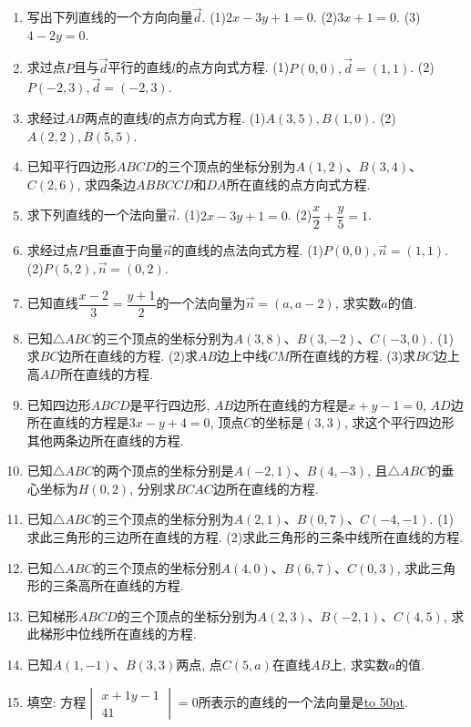 \documentclass[10pt,a4paper]{article}
\newcommand{\blank}[1]{\underline{\hbox to #1pt{}}}
\begin{document}
\begin{enumerate}[1.]



\item 写出下列直线的一个方向向量$\overrightarrow d$.
(1)$2x-3y+1=0$.						(2)$3x+1=0$.
(3)$4-2y=0$.
\item 求过点$P$且与$\overrightarrow d$平行的直线$l$的点方向式方程.
(1)$P(0,0),\overrightarrow d=(1,1)$.					(2)$P(-2,3),\overrightarrow d=(-2,3)$.
\item 求经过$AB$两点的直线$l$的点方向式方程.
(1)$A(3,5),B(1,0)$.						(2)$A(2,2),B(5,5)$.
\item 已知平行四边形$ABCD$的三个顶点的坐标分别为$A(1,2)$、$B(3,4)$、$C(2,6)$, 求四条边$ABBCCD$和$DA$所在直线的点方向式方程.
\item 求下列直线的一个法向量$\overrightarrow n$.
(1)$2x-3y+1=0$.						(2)$\dfrac x2+\dfrac y5=1$.
\item 求经过点$P$且垂直于向量$\overrightarrow n$的直线的点法向式方程.
(1)$P(0,0),\overrightarrow n=(1,1)$.					(2)$P(5,2),\overrightarrow n=(0,2)$.
\item 已知直线$\dfrac{x-2}3=\dfrac{y+1}2$的一个法向量为$\overrightarrow n=(a,a-2)$, 求实数$a$的值.
\item 已知$\triangle ABC$的三个顶点的坐标分别为$A(3,8)$、$B(3,-2)$、$C(-3,0)$.
(1)求$BC$边所在直线的方程.
(2)求$AB$边上中线$CM$所在直线的方程.
(3)求$BC$边上高$AD$所在直线的方程.
\item 已知四边形$ABCD$是平行四边形, $AB$边所在直线的方程是$x+y-1=0$, $AD$边所在直线的方程是$3x-y+4=0$, 顶点$C$的坐标是$(3,3)$, 求这个平行四边形其他两条边所在直线的方程.
\item 已知$\triangle ABC$的两个顶点的坐标分别是$A(-2,1)$、$B(4,-3)$, 且$\triangle ABC$的垂心坐标为$H(0,2)$, 分别求$BCAC$边所在直线的方程.
\item 已知$\triangle ABC$的三个顶点的坐标分别为$A(2,1)$、$B(0,7)$、$C(-4,-1)$.
(1)求此三角形的三边所在直线的方程.
(2)求此三角形的三条中线所在直线的方程.
\item 已知$\triangle ABC$的三个顶点的坐标分别$A(4,0)$、$B(6,7)$、$C(0,3)$, 求此三角形的三条高所在直线的方程.
\item 已知梯形$ABCD$的三个顶点的坐标分别为$A(2,3)$、$B(-2,1)$、$C(4,5)$, 求此梯形中位线所在直线的方程.
\item 已知$A(1,-1)$、$B(3,3)$两点, 点$C(5,a)$在直线$AB$上, 求实数$a$的值.
\item 填空:
方程$\begin{vmatrix}
    x+1  y-1  \\4  1  \end{vmatrix}=0$所表示的直线的一个法向量是\blank{50}.

\end{enumerate}
\end{document}
